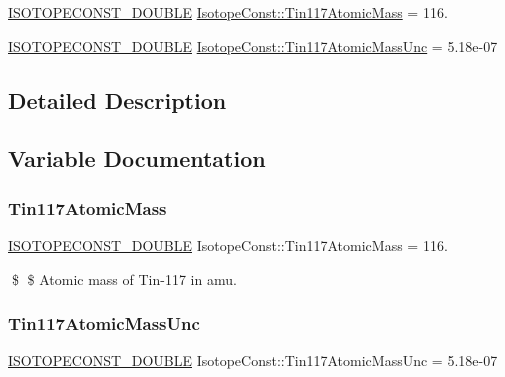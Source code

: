 \begin{DoxyCompactItemize}
\item 
\mbox{\hyperlink{group___isotope_const-_macros_ga8f45a7272ce02c0b4c65c44636ed719a}{I\+S\+O\+T\+O\+P\+E\+C\+O\+N\+S\+T\+\_\+\+D\+O\+U\+B\+LE}} \mbox{\hyperlink{group___isotope_const-_tin-_sn117_ga4c218b0844eab0d0ac178e5886c85014}{Isotope\+Const\+::\+Tin117\+Atomic\+Mass}} = 116.
\item 
\mbox{\hyperlink{group___isotope_const-_macros_ga8f45a7272ce02c0b4c65c44636ed719a}{I\+S\+O\+T\+O\+P\+E\+C\+O\+N\+S\+T\+\_\+\+D\+O\+U\+B\+LE}} \mbox{\hyperlink{group___isotope_const-_tin-_sn117_gac69fd6921f07f11b5cdb1f468993883b}{Isotope\+Const\+::\+Tin117\+Atomic\+Mass\+Unc}} = 5.\+18e-\/07
\end{DoxyCompactItemize}


\subsection{Detailed Description}


\subsection{Variable Documentation}
\mbox{\label{group___isotope_const-_tin-_sn117_ga4c218b0844eab0d0ac178e5886c85014}} 
\subsubsection{\texorpdfstring{Tin117\+Atomic\+Mass}{Tin117AtomicMass}}
{\footnotesize\ttfamily \mbox{\hyperlink{group___isotope_const-_macros_ga8f45a7272ce02c0b4c65c44636ed719a}{I\+S\+O\+T\+O\+P\+E\+C\+O\+N\+S\+T\+\_\+\+D\+O\+U\+B\+LE}} Isotope\+Const\+::\+Tin117\+Atomic\+Mass = 116.}

\$ \$ Atomic mass of Tin-\/117 in amu. \mbox{\label{group___isotope_const-_tin-_sn117_gac69fd6921f07f11b5cdb1f468993883b}} 
\subsubsection{\texorpdfstring{Tin117\+Atomic\+Mass\+Unc}{Tin117AtomicMassUnc}}
{\footnotesize\ttfamily \mbox{\hyperlink{group___isotope_const-_macros_ga8f45a7272ce02c0b4c65c44636ed719a}{I\+S\+O\+T\+O\+P\+E\+C\+O\+N\+S\+T\+\_\+\+D\+O\+U\+B\+LE}} Isotope\+Const\+::\+Tin117\+Atomic\+Mass\+Unc = 5.\+18e-\/07}

